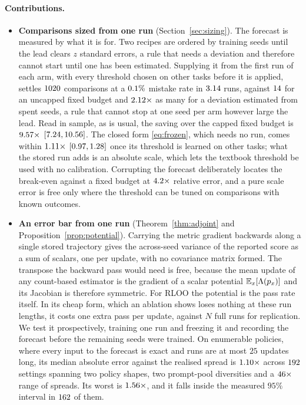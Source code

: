 \paragraph{Contributions.}
\begin{itemize}
  \item \textbf{Comparisons sized from one run} (Section~\ref{sec:sizing}). The forecast is
  measured by what it is for. Two recipes are ordered by training seeds until the lead clears $z$
  standard errors, a rule that needs a deviation and therefore cannot start until one has been
  estimated. Supplying it from the first run of each arm, with every threshold chosen on other
  tasks before it is applied, settles $1020$ comparisons at a $0.1\%$ mistake
  rate in $3.14$ runs, against $14$ for an
  uncapped fixed budget and $2.12\times$ as many for a deviation estimated
  from spent seeds, a rule that cannot stop at one seed per arm however large the lead. Read in
  sample, as is usual, the saving over the capped fixed budget is $9.57\times$
  $[7.24, 10.56]$. The closed form \eqref{eq:frozen}, which needs no run, comes
  within $1.11\times$ $[0.97, 1.28]$ once
  its threshold is learned on other tasks; what the stored run adds is an absolute scale, which
  lets the textbook threshold be used with no calibration. Corrupting the forecast deliberately
  locates the break-even against a fixed budget at $4.2\times$ relative error,
  and a pure scale error is free only where the threshold can be tuned on comparisons with known
  outcomes.

  \item \textbf{An error bar from one run} (Theorem~\ref{thm:adjoint} and
  Proposition~\ref{prop:potential}). Carrying the metric gradient backwards along a single stored
  trajectory gives the across-seed variance of the reported score as a sum of scalars, one per
  update, with no covariance matrix formed. The transpose the backward pass would need is free,
  because the mean update of any count-based estimator is the gradient of a scalar potential
  $\mathbb{E}_x[\Lambda(p_x)]$ and its Jacobian is therefore symmetric. For RLOO the potential is the
  pass rate itself. In its cheap form, which an ablation shows loses nothing at these run lengths,
  it costs one extra pass per update, against $N$ full runs for replication. We test it
  prospectively, training one run and freezing it and recording the forecast before the remaining
  seeds were trained. On enumerable policies, where every input to the forecast is exact and runs
  are at most $25$ updates long, its median absolute error against the realised spread is
  $1.10\times$ across $192$ settings spanning two policy shapes, two
  prompt-pool diversities and a $46\times$ range of spreads. Its worst is
  $1.56\times$, and it falls inside the measured $95\%$ interval in
  $162$ of them.


\end{itemize}

